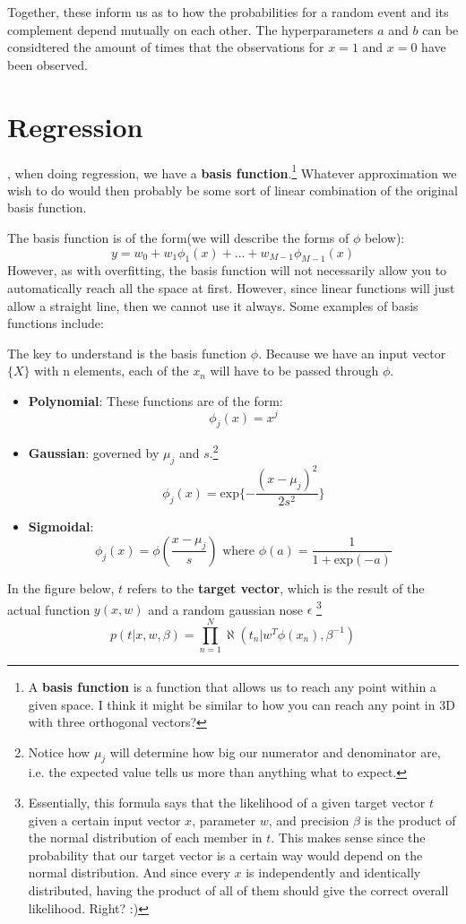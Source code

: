 \documentclass{tufte-handout}
\begin{document}
	Together, these inform us as to how the probabilities for a random event and its complement 
	depend mutually on each other. The hyperparameters $a$ and $b$ can be considtered the amount
	of times that the observations for $x=1$ and $x=0$ have been observed.

\section{Regression}
	, when doing regression, we have a \textbf{basis function}.\footnote{
	A \textbf{basis function} is a function that allows us to reach any point within a given space.
	I think it might be similar to how you can reach any point in 3D with three orthogonal vectors?}
	Whatever approximation we wish to do would then probably be some sort of linear combination of the 
	original basis function.
	
	The basis function is of the form(we will describe the forms of $\phi$ below):
	\[ y=w_{0}+w_{1}\phi_{1}(x)+...+w_{M-1}\phi_{M-1}(x)\]
	However, as with overfitting, the basis function will not necessarily allow you to automatically 
	reach all the space at first. However, since linear functions will just allow a straight line, then 
	we cannot use it always. Some examples of basis functions include:

	The key to understand is the basis function $\phi$. Because we have an input vector $\{X\}$ with n
	elements, each of the  $x_{n}$ will have to be passed through $\phi$.
	\begin{itemize}
			\item \textbf{Polynomial}: These functions are of the form:
					\[ \phi_{j}(x)=x^{j}\]
			\item \textbf{Gaussian}: governed by $\mu_{j}$ and $s$.\footnote{Notice how $\mu_{j}$
					will determine how big our numerator and denominator are, i.e. the expected value
					tells us more than anything what to expect.}	
					\[ \phi_{j}(x) = \textrm{exp}\{ -\frac{(x-\mu_{j})^{2}}{2s^{2}} \}\]
			\item \textbf{Sigmoidal}:
			\[ \phi_{j}(x) = \phi(\frac{x-\mu_{j}}{s}) \textrm{ where } \phi(a) = \frac{1}{1+\textrm{exp}(-a)}\]
	\end{itemize}

	In the figure below, $t$ refers to the \textbf{target vector}, which is the result of the actual
	function $y(x,w)$ and a random gaussian nose $\epsilon$
	\footnote{Essentially, this formula says that the 
	likelihood of a given target vector $t$
	given a certain input vector $x$, parameter $w$, and precision $\beta$ is the product 
	of the normal distribution of each member in $t$. This makes sense since the probability 
	that our target vector is a certain way would depend on the normal distribution. And since 
	every $x$ is independently and identically distributed, having the product of all of them
	should give the correct overall likelihood. Right? :) }
	\[ p(t|x,w,\beta ) = \prod_{n=1}^{N}\aleph(t_{n}|w^{T}\phi(x_{n}),\beta^{-1}) \]
\end{document}
